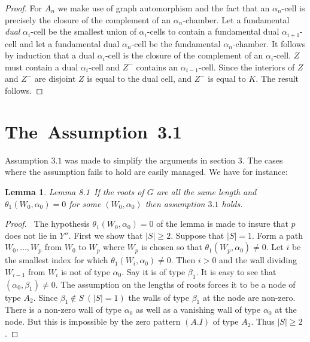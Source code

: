 \documentclass{memo-l}
\newtheorem{lemma}[theorem]{Lemma}
\theoremstyle{definition}
\theoremstyle{remark}
\numberwithin{section}{chapter}
\numberwithin{equation}{chapter}
\begin{document}
\begin{proof}
For $A_{n}$ we make
use of graph automorphism and the fact that an ${\alpha}_{n}$-cell is
precisely the closure of the complement of an ${\alpha}_{n}$-chamber.  Let
a fundamental {\it dual} ${\alpha}_{i}$-cell be the smallest union of
${\alpha}_{i}$-cells to contain a fundamental dual ${\alpha}_{i+1}$-cell
and let a fundamental dual ${\alpha}_{n}$-cell be the fundamental
${\alpha}_{n}$-chamber.  It follows by induction that a dual
${\alpha}_{i}$-cell is the closure of the complement of an
${\alpha}_{i}$-cell.  $Z$ must contain a dual ${\alpha}_{i}$-cell and
$Z^{-}$ contains an ${\alpha}_{i-1}$-cell.  Since the interiors of $Z$ and
$Z^{-}$ are disjoint $Z$ is equal to the dual cell, and $Z^{-}$ is equal to
$K$.  The result follows.
\end{proof}

\section{The\ Assumption\ 3.1}

   Assumption $3.1$ was made to simplify the arguments in section $3$.  The
cases where the assumption fails to hold are easily managed.  We have for
instance:



\begin{lemma}{Lemma 8.1}\ If the roots of $G$ are all the same length and
${\theta}_{1}(W_{0},{\alpha}_{0})=0$ for some $(W_{0},{\alpha}_{0})$ then
assumption $3.1$ holds.
\end{lemma}


\begin{proof} \ The hypothesis ${\theta}_{1}(W_{0},{\alpha}_{0}) = 0$ of
the lemma is made to insure that $p$ does not lie in $Y''$.  First we show
that $\vert S\vert \ge 2$.  Suppose that $\vert S\vert = 1$.  Form a
path $W_{0},\ldots ,W_{p}$ from $W_{0}$ to $W_{p}$ where $W_{p}$ is chosen
so that ${\theta}_{1}(W_{p},{\alpha}_{0})\ne 0$.  Let $i$ be the smallest
index for which ${\theta}_{1}(W_{i},{\alpha}_{0})\ne 0$.  Then $i > 0$ and
the wall dividing $W_{i-1}$ from $W_{i}$ is not of type ${\alpha}_{0}$.
Say it is of type ${\beta}_{1}$.  It is easy to see that
$({\alpha}_{0},{\beta}_{1}) \ne 0$.  The assumption on the lengths of roots
forces it to be a node of type $A_{2}$.  Since ${\beta}_{1} {\not\in} S \ (\vert
S\vert =1)$ the walls of type ${\beta}_{1}$ at the node are non-zero.
There is a non-zero wall of type ${\alpha}_{0}$ as well as a vanishing wall
of type ${\alpha}_{0}$ at the node.  But this is impossible by the zero
pattern $(A.I)$ of type $A_{2}$.  Thus $\vert S\vert \ge 2$.
\end{proof}
\end{document}
